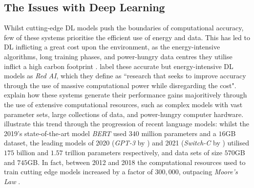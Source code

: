 \documentclass[a4paper, 11pt]{report}
\begin{document}
    \subsection{The Issues with Deep Learning}

    Whilst cutting-edge DL models push the boundaries of computational accuracy, few of these systems prioritise the efficient use of energy and data. This has led to DL inflicting a great cost upon the environment, as the energy-intensive algorithms, long training phases, and power-hungry data centres they utilise inflict a high carbon footprint \citep{lacoste-2019}. \citet{schwartz-2019} label these accurate but energy-intensive DL models as \emph{Red AI}, which they define as ``research that seeks to improve accuracy through the use of massive computational power while disregarding the cost". \citeauthor{schwartz-2019} explain how these systems generate their performance gains majoritively through the use of extensive computational resources, such as complex models with vast parameter sets, large collections of data, and power-hungry computer hardware. \citet{bender-2021} illustrate this trend through the progression of recent language models: whilst the 2019's state-of-the-art model \emph{BERT} \citep{devlin-2018} used $340$ million parameters and a $16$GB dataset, the leading models of 2020 (\emph{GPT-3} by \citet{brown-2020}) and 2021 (\emph{Switch-C} by \citet{fedus-2021}) utilised $175$ billion and $1.57$ trillion parameters respectively, and data sets of size $570$GB and $745$GB. In fact, between 2012 and 2018 the computational resources used to train cutting edge models increased by a factor of $300,000$, outpacing \emph{Moore's Law} \citep{amodei-2021}.
\end{document}
